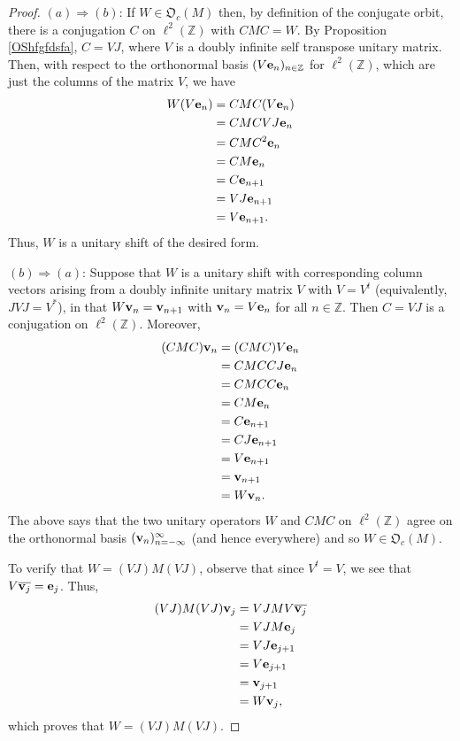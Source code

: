 \documentclass{dis}
\theoremstyle{plain}
\theoremstyle{definition}
\def\Z{\mathbb{Z}}
\renewcommand{\vec}[1]{{\bf #1}}
\newcommand{\0}{{\color{lightgray}0}}
\begin{document}
\begin{proof}
$(a) \Longrightarrow (b)$: If $W \in \mathfrak{O}_c(M)$ then, by definition of the conjugate orbit, there is a conjugation $C$ on $\ell^2(\Z)$ with $C M C = W$. By Proposition \ref{OShfgfdsfa}, $C = V J$, where  $V$ is a doubly infinite self transpose unitary matrix. Then, with respect to the orthonormal basis  $(V \vec{e}_{n})_{n \in \Z}$ for $\ell^2(\Z)$, which are just the columns of the matrix  $V$, we have
\begin{align*}
W (V \vec{e}_n) & = 
C M C (V \vec{e}_n)\\
 & = C M C V J \vec{e}_n\\
& = C M C^2 \vec{e}_n \\
&= C M \vec{e}_n \\
&= C \vec{e}_{n + 1} \\
& = V J \vec{e}_{n + 1} \\
& = V \vec{e}_{n + 1}.
\end{align*}
Thus, $W$ is a unitary shift of the desired form.

$(b) \Longrightarrow (a)$: 
Suppose that $W$ is a unitary shift with corresponding column vectors arising from a doubly infinite unitary matrix  $V$ with $V = V^{t}$ (equivalently, $J V J = V^{*}$),  in that $W \vec{v}_n = \vec{v}_{n + 1}$ with $\vec{v}_{n} = V \vec{e}_n$ for all $n \in \Z$.  Then $C = V J$ is a conjugation on $\ell^2(\Z)$. 
Moreover,
\begin{align*}
(CMC) \vec{v}_n & = (C M C) V \vec{e}_n\\
& = C M C C J \vec{e}_n\\
&= C M C C \vec{e}_{n}\\
& = C M \vec{e}_{n}\\
& = C \vec{e}_{n + 1}\\
& = C J \vec{e}_{n + 1}\\
& = V \vec{e}_{n + 1}\\
& = \vec{v}_{n + 1}\\
& = W \vec{v}_n.
\end{align*}
The above says that the two unitary operators $W$ and $CMC$ on $\ell^2(\Z)$ agree on the orthonormal basis $(\vec{v}_n)_{n = -\infty}^{\infty}$ (and hence everywhere) and so $W \in \mathfrak{O}_c(M)$. 

To verify that $W = (VJ) M (VJ)$, observe that since $V^{t} = V$, we see that $V \overline{\vec{v}_j} = \vec{e}_j$. Thus, 
\begin{align*}
(VJ) M (VJ) \vec{v}_j & = VJ M V \overline{\vec{v}_j}\\
& = VJ M \vec{e}_j\\
& = VJ \vec{e}_{j + 1}\\
& = V \vec{e}_{j + 1}\\
& = \vec{v}_{j + 1}\\
& = W \vec{v}_{j},
\end{align*}
which proves that $W = (V J) M (VJ)$.
\end{proof}
\end{document}
